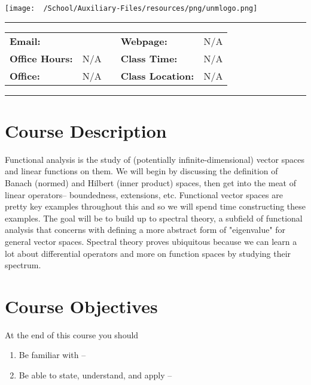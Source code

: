 \documentclass[course=Introduction\ to\ Functional\ Analysis, semester=Fall\ 2021]{syllabustemplate}
\def\classtime{N/A}
\def\classroom{N/A}
\def\officeloc{N/A}
\def\officehours{N/A}
\def\webpage{N/A}
\begin{document}

\begin{center}
\texttt{[image: ~/School/Auxiliary-Files/resources/png/unmlogo.png]}
\end{center}
{\let\newpage\relax\maketitle}
\thispagestyle{empty}
\vspace{0.15\textheight}
\begin{center}
	\hrule\vspace{1em}
	\noindent
	\begin{tabularx}{\hsize}{llXll}
		\textbf{Email:} & \email & & \textbf{Webpage:} & \webpage \\
		\textbf{Office Hours:} & \officehours & & \textbf{Class Time:} & \classtime\\
		\textbf{Office:} & \officeloc & & \textbf{Class Location:} & \classroom%
\end{tabularx}
\vspace{1em}
	\hrule
\end{center}

\pagebreak

\section{Course Description}
\label{sec:course_description}

Functional analysis is the study of (potentially infinite-dimensional) vector spaces and linear functions on them. We will begin by discussing the definition of Banach (normed) and Hilbert (inner product) spaces, then get into the meat of linear operators-- boundedness, extensions, etc. Functional vector spaces are pretty key examples throughout this and so we will spend time constructing these examples. The goal will be to build up to spectral theory, a subfield of functional analysis that concerns with defining a more abstract form of "eigenvalue" for general vector spaces. Spectral theory proves ubiquitous because we can learn a lot about differential operators and more on function spaces by studying their spectrum. 

\section{Course Objectives}
\label{sec:course_objectives}
At the end of this course you should
\begin{enumerate}
	\item Be familiar with --
	\item Be able to state, understand, and apply --
\end{enumerate}
\end{document}
